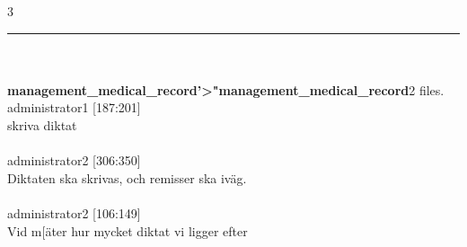 \documentclass[12pt,a4paper,oneside]{article}
\begin{document}
3 
\hrule
\ \\\ \\{\bf management\_medical\_record'>"management\_medical\_record}2 files.
 administrator1 [187:201]\\ 
 skriva diktat %
\ \\\ \\
 administrator2 [306:350]\\ 
Diktaten ska skrivas, och remisser ska iv{\"a}g. %
\ \\\ \\
 administrator2 [106:149]\\ 
Vid m[{\"a}ter hur mycket diktat vi ligger efter %
\end{document}
